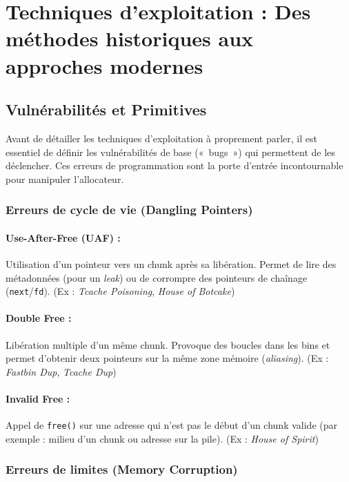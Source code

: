 \section{Techniques d'exploitation : Des méthodes historiques aux approches modernes}

\subsection{Vulnérabilités et Primitives}

Avant de détailler les techniques d'exploitation à proprement parler, il est essentiel de définir les vulnérabilités de base («~bugs~») qui permettent de les déclencher. Ces erreurs de programmation sont la porte d'entrée incontournable pour manipuler l'allocateur.

\subsubsection{Erreurs de cycle de vie (Dangling Pointers)}

\paragraph{Use-After-Free (UAF) :} Utilisation d'un pointeur vers un chunk après sa libération. Permet de lire des métadonnées (pour un \textit{leak}) ou de corrompre des pointeurs de chaînage (\texttt{next}/\texttt{fd}). (Ex : \textit{Tcache Poisoning}, \textit{House of Botcake})

\paragraph{Double Free :} Libération multiple d'un même chunk. Provoque des boucles dans les bins et permet d'obtenir deux pointeurs sur la même zone mémoire (\textit{aliasing}). (Ex : \textit{Fastbin Dup}, \textit{Tcache Dup})

\paragraph{Invalid Free :} Appel de \texttt{free()} sur une adresse qui n'est pas le début d'un chunk valide (par exemple : milieu d'un chunk ou adresse sur la pile). (Ex : \textit{House of Spirit})

\subsubsection{Erreurs de limites (Memory Corruption)}

